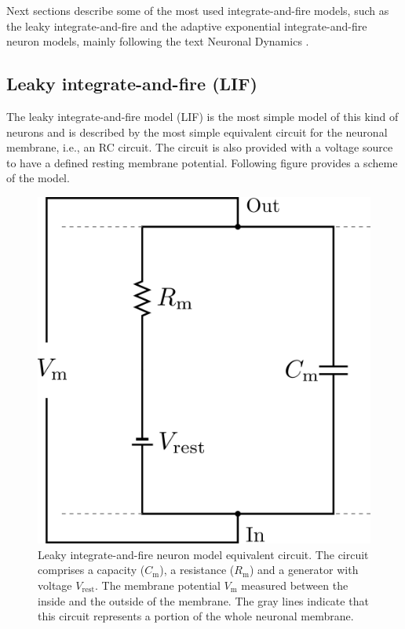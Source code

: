 \documentclass[a4paper, 12pt, twoside, openright]{book}
\begin{document}
Next sections describe some of the most used integrate-and-fire models, such as the leaky integrate-and-fire and the adaptive exponential integrate-and-fire neuron models, mainly following the text Neuronal Dynamics \cite{Gerstner2014}.

\subsection{Leaky integrate-and-fire (LIF)}
\label{sec:lif_description}
The leaky integrate-and-fire model (LIF) is the most simple model of this kind of neurons and is described by the most simple equivalent circuit for the neuronal membrane, i.e., an RC circuit. The circuit is also provided with a voltage source to have a defined resting membrane potential. Following figure provides a scheme of the model.

\begin{figure}[H]
    \centering
    \includegraphics[width=0.3\columnwidth]{figures/LIF_RC_circuit.png}
    \caption{Leaky integrate-and-fire neuron model equivalent circuit. The circuit comprises a capacity ($C_{\text{m}}$), a resistance ($R_{\text{m}}$) and a generator with voltage $V_{\text{rest}}$.
    The membrane potential $V_{\text{m}}$ measured between the inside and the outside of the membrane. The gray lines indicate that this circuit represents a portion of the whole neuronal membrane.}
    \label{fig:RC_circuit_LIF}
\end{figure}
\end{document}
